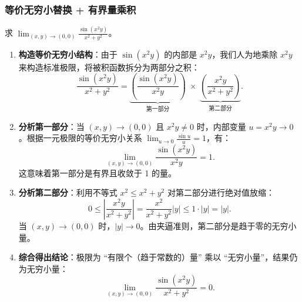 \documentclass[lang=cn,11pt]{elegantbook}
\begin{document}
\subsubsection{等价无穷小替换 + 有界量乘积}

\begin{exercise}[等价无穷小的应用] \label{ex:limit-product}
求 $\displaystyle\lim_{(x,y)\to(0,0)}\frac{\sin(x^2y)}{x^2+y^2}$。
\end{exercise}

\begin{solution}
\begin{enumerate}
  \item \textbf{构造等价无穷小结构}：由于 $\sin(x^2y)$ 的内部是 $x^2y$，我们人为地乘除 $x^2y$ 来构造标准极限，将被积函数拆分为两部分之积：
  \[
  \frac{\sin(x^2y)}{x^2+y^2} = \underbrace{\left( \frac{\sin(x^2y)}{x^2y} \right)}_{\text{第一部分}} \;\times\; \underbrace{\left( \frac{x^2y}{x^2+y^2} \right)}_{\text{第二部分}}.
  \]
  
  \item \textbf{分析第一部分}：当 $(x,y)\to(0,0)$ 且 $x^2y \neq 0$ 时，内部变量 $u=x^2y \to 0$。根据一元极限的等价无穷小关系 $\lim_{u\to 0}\frac{\sin u}{u} = 1$，有：
  \[
  \lim_{(x,y)\to(0,0)}\frac{\sin(x^2y)}{x^2y} = 1.
  \]
  这意味着第一部分是有界且收敛于 1 的量。

  \item \textbf{分析第二部分}：利用不等式 $x^2 \leqslant  x^2+y^2$ 对第二部分进行绝对值放缩：
  \[
  0 \leqslant  \left|\frac{x^2y}{x^2+y^2}\right| = \frac{x^2}{x^2+y^2}|y| \leqslant  1 \cdot |y| = |y|.
  \]
  当 $(x,y)\to(0,0)$ 时，$|y| \to 0$。由夹逼准则，第二部分是趋于零的无穷小量。

  \item \textbf{综合得出结论}：极限为 ``有限个（趋于常数的）量'' 乘以 ``无穷小量''，结果仍为无穷小量：
  \[
  \boxed{\lim_{(x,y)\to(0,0)}\frac{\sin(x^2y)}{x^2+y^2}=0}.
  \]
\end{enumerate}
\end{solution}
\end{document}
